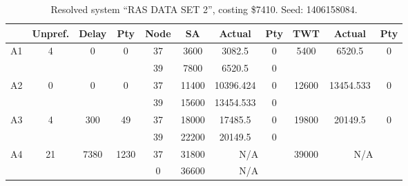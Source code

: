 \begin{sidewaystable}
\footnotesize
\caption{Resolved system ``RAS DATA SET 2'', costing \$7410. Seed: 1406158084.}
\centering
\begin{tabular}{c||c|c|c||c|c|c|c||c|c|c}
  \hline \hline
  &
  Unpref. & 
  Delay &
  Pty &
  Node &
  SA &
  Actual &
  Pty &
  TWT &
  Actual &
  Pty \\
      \hline
      \multirow{2}{*}{A1} &
      \multirow{2}{*}{4} &
      \multirow{2}{*}{0} &
      \multirow{2}{*}{0} &
      37 &
      3600 &
        3082.5 &
        0 &
      \multirow{2}{*}{5400} &
        \multirow{2}{*}{6520.5} &
        \multirow{2}{*}{0}
      \\
      \cline{5-8}
       &
       &
       &
       &
      39 &
      7800 &
        6520.5 &
        0 &
      
         &
        
      \\
      \hline
      \multirow{2}{*}{A2} &
      \multirow{2}{*}{0} &
      \multirow{2}{*}{0} &
      \multirow{2}{*}{0} &
      37 &
      11400 &
        10396.424 &
        0 &
      \multirow{2}{*}{12600} &
        \multirow{2}{*}{13454.533} &
        \multirow{2}{*}{0}
      \\
      \cline{5-8}
       &
       &
       &
       &
      39 &
      15600 &
        13454.533 &
        0 &
      
         &
        
      \\
      \hline
      \multirow{2}{*}{A3} &
      \multirow{2}{*}{4} &
      \multirow{2}{*}{300} &
      \multirow{2}{*}{49} &
      37 &
      18000 &
        17485.5 &
        0 &
      \multirow{2}{*}{19800} &
        \multirow{2}{*}{20149.5} &
        \multirow{2}{*}{0}
      \\
      \cline{5-8}
       &
       &
       &
       &
      39 &
      22200 &
        20149.5 &
        0 &
      
         &
        
      \\
      \hline
      \multirow{2}{*}{A4} &
      \multirow{2}{*}{21} &
      \multirow{2}{*}{7380} &
      \multirow{2}{*}{1230} &
      37 &
      31800 &
        \multicolumn{2}{|c||}{N/A} &
      \multirow{2}{*}{39000} &
        \multicolumn{2}{c}{\multirow{2}{*}{N/A}}
      \\
      \cline{5-8}
       &
       &
       &
       &
      0 &
      36600 &
        \multicolumn{2}{|c||}{N/A} &
      

\end{tabular}
\end{sidewaystable}
